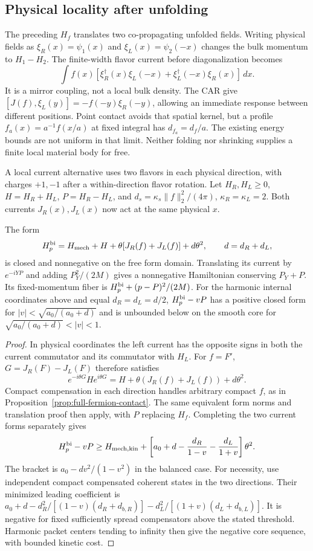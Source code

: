 \subsection{Physical locality after unfolding}
\label{sec:physical-locality}

The preceding $H_f$ translates two co-propagating unfolded fields.
Writing physical fields as $\xi_R(x)=\psi_1(x)$ and
$\xi_L(x)=\psi_2(-x)$ changes the bulk momentum to $H_1-H_2$.
The finite-width flavor current before diagonalization becomes
\[
 \int f(x)[\xi_R^\dagger(x)\xi_L(-x)
                    +\xi_L^\dagger(-x)\xi_R(x)]\,dx.
\]
It is a mirror coupling, not a local bulk density. The CAR give
$[J(f),\xi_L(y)]=-f(-y)\xi_R(-y)$, allowing an immediate response
between different positions. Point contact avoids that spatial kernel,
but a profile $f_a(x)=a^{-1}f(x/a)$ at fixed integral has
$d_{f_a}=d_f/a$. The existing energy bounds are not uniform in that
limit. Neither folding nor shrinking supplies a finite local material
body for free.

A local current alternative uses two flavors in each physical direction,
with charges $+1,-1$ after a within-direction flavor rotation. Let
$H_R,H_L\ge0$, $H=H_R+H_L$, $P=H_R-H_L$, and
$d_s=\kappa_s\|f\|_2^2/(4\pi)$, $\kappa_R=\kappa_L=2$.
Both currents $J_R(x),J_L(x)$ now act at the same physical $x$.

\begin{proposition}
\label{prop:bidirectional-current}
The form
\[
 H_p^{\rm bi}=H_{\rm mech}+H+
          \theta[J_R(f)+J_L(f)]+d\theta^2,
 \qquad d=d_R+d_L,
\]
is closed and nonnegative on the free form domain. Translating its
current by $e^{-iYP}$ and adding $P_Y^2/(2M)$ gives a nonnegative
Hamiltonian conserving $P_Y+P$. Its fixed-momentum fiber is
$H_p^{\rm bi}+(p-P)^2/(2M)$.
For the harmonic internal coordinates above and equal $d_R=d_L=d/2$,
$H_p^{\rm bi}-vP$ has a positive closed form for
$|v|<\sqrt{a_0/(a_0+d)}$ and is unbounded below on the smooth core
for $\sqrt{a_0/(a_0+d)}<|v|<1$.
\end{proposition}
\begin{proof}
In physical coordinates the left current has the opposite signs in both
the current commutator and its commutator with $H_L$. For $f=F'$,
$G=J_R(F)-J_L(F)$ therefore satisfies
\[
 e^{-i\theta G}He^{i\theta G}
       =H+\theta(J_R(f)+J_L(f))+d\theta^2.
\]
Compact compensation in each direction handles arbitrary compact $f$,
as in Proposition~\ref{prop:full-fermion-contact}. The same equivalent
form norms and translation proof then apply, with $P$ replacing $H_f$.
Completing the two current forms separately gives
\[
 H_p^{\rm bi}-vP\ge H_{\rm mech,kin}
 +\left[a_0+d-\frac{d_R}{1-v}-\frac{d_L}{1+v}\right]\theta^2.
\]
The bracket is $a_0-dv^2/(1-v^2)$ in the balanced case. For necessity,
use independent compact compensated coherent states in the two
directions. Their minimized leading coefficient is
$a_0+d-d_R^2/[(1-v)(d_R+d_{b,R})]
       -d_L^2/[(1+v)(d_L+d_{b,L})]$.
It is negative for fixed sufficiently spread compensators above the
stated threshold. Harmonic packet centers tending to infinity then
give the negative core sequence, with bounded kinetic cost.
\end{proof}

